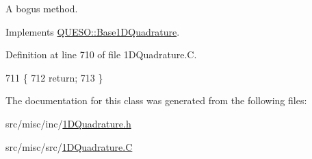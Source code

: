 A bogus method. 



Implements \hyperlink{class_q_u_e_s_o_1_1_base1_d_quadrature_a37bdd63ba8b986e02d47b05fc8795332}{Q\-U\-E\-S\-O\-::\-Base1\-D\-Quadrature}.



Definition at line 710 of file 1\-D\-Quadrature.\-C.


\begin{DoxyCode}
711 \{
712   \textcolor{keywordflow}{return};
713 \}
\end{DoxyCode}


The documentation for this class was generated from the following files\-:\begin{DoxyCompactItemize}
\item 
src/misc/inc/\hyperlink{1_d_quadrature_8h}{1\-D\-Quadrature.\-h}\item 
src/misc/src/\hyperlink{1_d_quadrature_8_c}{1\-D\-Quadrature.\-C}\end{DoxyCompactItemize}
